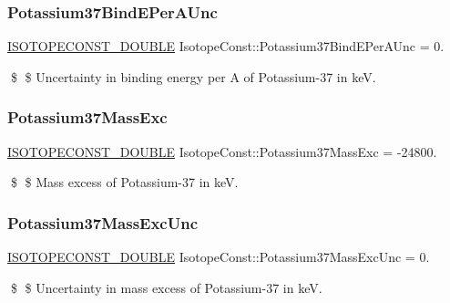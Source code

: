 \subsubsection{\texorpdfstring{Potassium37\+Bind\+E\+Per\+A\+Unc}{Potassium37BindEPerAUnc}}
{\footnotesize\ttfamily \mbox{\hyperlink{group___isotope_const-_macros_ga8f45a7272ce02c0b4c65c44636ed719a}{I\+S\+O\+T\+O\+P\+E\+C\+O\+N\+S\+T\+\_\+\+D\+O\+U\+B\+LE}} Isotope\+Const\+::\+Potassium37\+Bind\+E\+Per\+A\+Unc = 0.}

\$ \$ Uncertainty in binding energy per A of Potassium-\/37 in keV. \mbox{\label{group___isotope_const-_potassium-_k37_gad7b27d4ca6c460fb8b2f500e5459606a}} 
\subsubsection{\texorpdfstring{Potassium37\+Mass\+Exc}{Potassium37MassExc}}
{\footnotesize\ttfamily \mbox{\hyperlink{group___isotope_const-_macros_ga8f45a7272ce02c0b4c65c44636ed719a}{I\+S\+O\+T\+O\+P\+E\+C\+O\+N\+S\+T\+\_\+\+D\+O\+U\+B\+LE}} Isotope\+Const\+::\+Potassium37\+Mass\+Exc = -\/24800.}

\$ \$ Mass excess of Potassium-\/37 in keV. \mbox{\label{group___isotope_const-_potassium-_k37_gae2c27e9384606f44ac5d7033abc67cab}} 
\subsubsection{\texorpdfstring{Potassium37\+Mass\+Exc\+Unc}{Potassium37MassExcUnc}}
{\footnotesize\ttfamily \mbox{\hyperlink{group___isotope_const-_macros_ga8f45a7272ce02c0b4c65c44636ed719a}{I\+S\+O\+T\+O\+P\+E\+C\+O\+N\+S\+T\+\_\+\+D\+O\+U\+B\+LE}} Isotope\+Const\+::\+Potassium37\+Mass\+Exc\+Unc = 0.}

\$ \$ Uncertainty in mass excess of Potassium-\/37 in keV. \mbox{\label{group___isotope_const-_potassium-_k37_ga3f5e36ce93ca88d6e8cc5360aed08a33}} 
